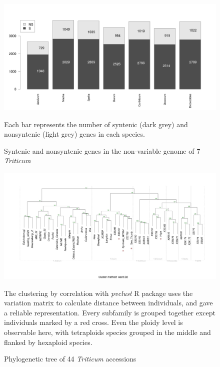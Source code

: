 \documentclass[a4paper, 12pt]{article}
\begin{document}
\begin{onehalfspace}
\newpage 
\thispagestyle{empty}
    \begin{figure}
    \vspace{-0.8cm}
      \centering \includegraphics[scale=0.28]{Figures/Figure_22.jpg}
      \vspace{0.3cm}
      \caption{Syntenic and nonsyntenic genes in the non-variable genome of 7 \textit{Triticum}}
      \label{fig:F22}
    \footnotesize{Each bar represents the number of syntenic (dark grey) and nonsyntenic (light grey) genes in each species.}
    \end{figure}
    \begin{figure} 	
      \centering \includegraphics[scale=0.28]{Figures/Figure_23.jpg}
      \vspace{0.5cm}
      \caption{Phylogenetic tree of 44 \textit{Triticum} accessions} 
      \label{fig:F23}
    \footnotesize{The clustering by correlation with \textit{pvclust} R package uses the variation matrix to calculate distance between individuals, and gave a reliable representation. Every subfamily is grouped together except individuals marked by a red cross. Even the ploidy level is observable here, with tetraploids species grouped in the middle and flanked by hexaploid species.}
    \end{figure}
\addtocounter{page}{-1}
\newpage
\clearpage %


\end{onehalfspace}
\end{document}
